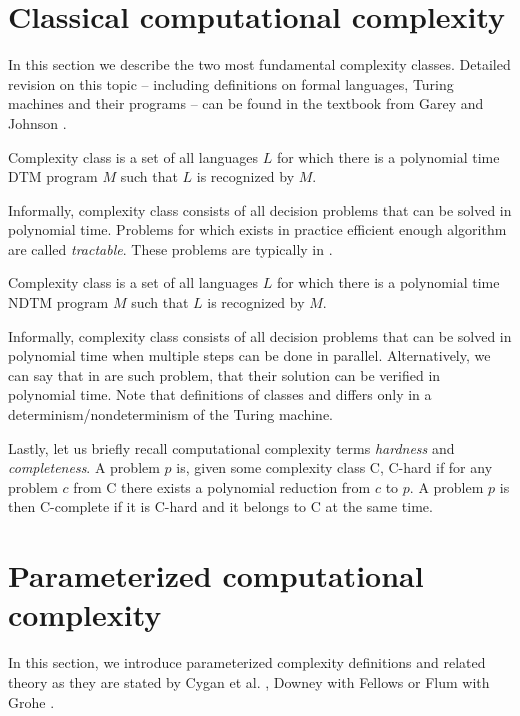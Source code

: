 \section{Classical computational complexity}

In this section we describe the two most fundamental complexity classes.
Detailed revision on this topic --
including definitions on formal languages, Turing machines and their programs --
can be found in the textbook from Garey and Johnson \cite{Garey1990}. 

\begin{definition}[\Po]
    Complexity class \Po is a set of all languages $L$ for which there is a polynomial time DTM program $M$
    such that $L$ is recognized by $M$.
\end{definition}
Informally, complexity class \Po consists of all decision problems that can be solved in polynomial time.
Problems for which exists in practice efficient enough algorithm are called \emph{tractable}.
These problems are typically in \Po.

\begin{definition}[\NP]
    Complexity class \NP is a set of all languages $L$ for which there is a polynomial time NDTM program $M$
    such that $L$ is recognized by $M$.
\end{definition}
Informally, complexity class \NP consists of all decision problems that can be solved in polynomial time
when multiple steps can be done in parallel.
Alternatively, we can say that in \NP are such problem, that their solution can be verified in polynomial time.
Note that definitions of classes \Po and \NP differs only in a determinism/nondeterminism of the Turing machine.

Lastly, let us briefly recall computational complexity terms \emph{hardness} and \emph{completeness}.
A problem $p$ is, given some complexity class \textsf{C}, \textsf{C-hard} if for any problem $c$ from \textsf{C}
there exists a polynomial reduction from $c$ to $p$.
A problem $p$ is then \textsf{C-complete} if it is \textsf{C-hard} and it belongs to \textsf{C} at the same time.


\section{Parameterized computational complexity}

In this section, we introduce parameterized complexity definitions and related theory as they are stated by
Cygan et al. \cite{Cygan2015}, Downey with Fellows \cite{Downey2002} or Flum with Grohe \cite{Flum2006}.

